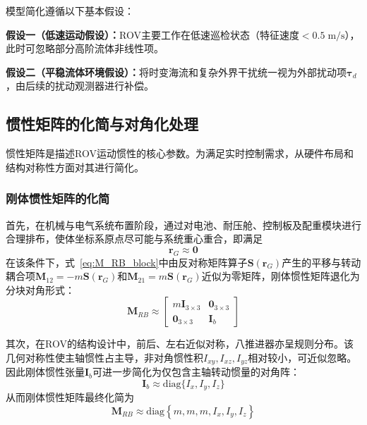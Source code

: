 模型简化遵循以下基本假设：

\noindent\textbf{假设一（低速运动假设）：}ROV主要工作在低速巡检状态（特征速度$<0.5\;\mathrm{m/s}$），此时可忽略部分高阶流体非线性项。

\noindent\textbf{假设二（平稳流体环境假设）：}将时变海流和复杂外界干扰统一视为外部扰动项$\boldsymbol{\tau}_d$，由后续的扰动观测器进行补偿。

\subsection{惯性矩阵的化简与对角化处理}

惯性矩阵是描述ROV运动惯性的核心参数。为满足实时控制需求，从硬件布局和结构对称性方面对其进行简化。

\subsubsection{刚体惯性矩阵的化简}


首先，在机械与电气系统布置阶段，通过对电池、耐压舱、控制板及配重模块进行合理排布，使体坐标系原点尽可能与系统重心重合，即满足
\begin{equation}
    \boldsymbol{r}_{G}\approx \boldsymbol{0}
\end{equation}
在该条件下，式~\eqref{eq:M_RB_block}中由反对称矩阵算子$\boldsymbol{S}(\boldsymbol{r}_G)$产生的平移与转动耦合项$\boldsymbol{M}_{12}=-m\boldsymbol{S}(\boldsymbol{r}_G)$和$\boldsymbol{M}_{21}=m\boldsymbol{S}(\boldsymbol{r}_G)$近似为零矩阵，刚体惯性矩阵退化为分块对角形式：
\begin{equation}
    \boldsymbol{M}_{RB}\approx
    \begin{bmatrix}
        m\boldsymbol{I}_{3\times3} & \boldsymbol{0}_{3\times3} \\
        \boldsymbol{0}_{3\times3} & \boldsymbol{I}_b
    \end{bmatrix}
\end{equation}

其次，在ROV的结构设计中，前后、左右近似对称，八推进器亦呈规则分布。该几何对称性使主轴惯性占主导，非对角惯性积$I_{xy},I_{xz},I_{yz}$相对较小，可近似忽略。因此刚体惯性张量$\boldsymbol{I}_b$可进一步简化为仅包含主轴转动惯量的对角阵：
\begin{equation}
    \boldsymbol{I}_b \approx \mathrm{diag}\{I_x,I_y,I_z\}
\end{equation}
从而刚体惯性矩阵最终化简为
\begin{equation}
    \boldsymbol{M}_{RB}\approx
    \mathrm{diag}
    \left\{
        m,m,m,I_{x},I_{y},I_{z}
    \right\}
\end{equation}


